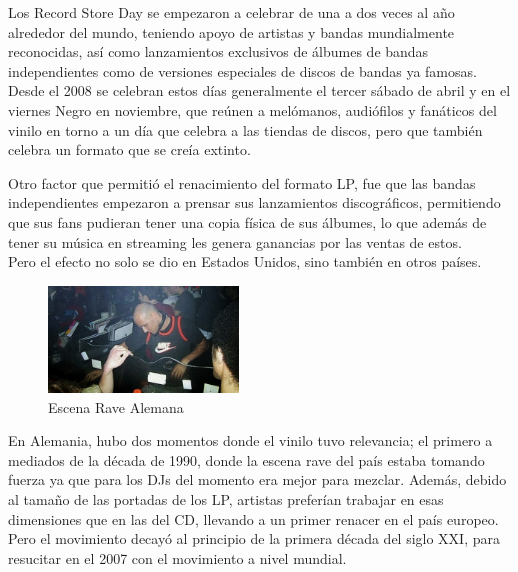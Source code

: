 \documentclass{article}
\begin{document}
Los Record Store Day se empezaron a celebrar de una a dos veces al año alrededor del mundo, teniendo apoyo de artistas y bandas mundialmente reconocidas, así como lanzamientos exclusivos de álbumes de bandas independientes como de versiones especiales de discos de bandas ya famosas. Desde el 2008 se celebran estos días generalmente el tercer sábado de abril y en el viernes Negro en noviembre, que reúnen a melómanos, audiófilos y fanáticos del vinilo en torno a un día que celebra a las tiendas de discos, pero que también celebra un formato que se creía extinto.\cite{wikiRSD}\\

\endgroup

Otro factor que permitió el renacimiento del formato LP, fue que las bandas independientes empezaron a prensar sus lanzamientos discográficos, permitiendo que sus fans pudieran tener una copia física de sus álbumes, lo que además de tener su música en streaming les genera ganancias por las ventas de estos.\cite{youtube}\\

Pero el efecto no solo se dio en Estados Unidos, sino también en otros países.\\

\begingroup
\setlength{\intextsep}{0pt}%
\setlength{\columnsep}{0pt}%

\begin{figure}
    \centering
    \includegraphics[width=0.45\textwidth]{images/german.jpg}
    \vspace{-5pt}
    \caption{Escena Rave Alemana}
\end{figure}

En Alemania, hubo dos momentos donde el vinilo tuvo relevancia; el primero a mediados de la década de 1990, donde la escena rave del país estaba tomando fuerza ya que para los DJs del momento era mejor para mezclar. Además, debido al tamaño de las portadas de los LP, artistas preferían trabajar en esas dimensiones que en las del CD, llevando a un primer renacer en el país europeo. Pero el movimiento decayó al principio de la primera década del siglo XXI, para resucitar en el 2007 con el movimiento a nivel mundial.\cite{wikirevival}\\
\end{document}

